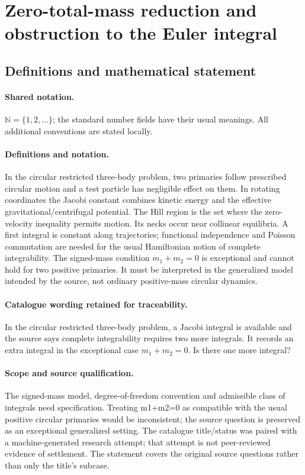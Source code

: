 \documentclass[11pt]{article}
\begin{document}
\section{Zero-total-mass reduction and obstruction to the Euler integral}\label{statement}

\subsection{Definitions and mathematical statement}

\paragraph{Shared notation.}$\mathbb N=\{1,2,\ldots\}$; the standard number fields have their usual meanings. All additional conventions are stated locally.


\paragraph{Definitions and notation.}In the circular restricted three-body problem, two primaries follow prescribed circular motion and a test particle has negligible effect on them. In rotating coordinates the Jacobi constant combines kinetic energy and the effective gravitational/centrifugal potential. The Hill region is the set where the zero-velocity inequality permits motion. Its necks occur near collinear equilibria. A first integral is constant along trajectories; functional independence and Poisson commutation are needed for the usual Hamiltonian notion of complete integrability. The signed-mass condition $m_1+m_2=0$ is exceptional and cannot hold for two positive primaries. It must be interpreted in the generalized model intended by the source, not ordinary positive-mass circular dynamics.

\paragraph{Catalogue wording retained for traceability.}
In the circular restricted three-body problem, a Jacobi integral is available and the source says complete integrability requires two more integrals. It records an extra integral in the exceptional case $m_1+m_2=0$. Is there one more integral?
\paragraph{Scope and source qualification.}The signed-mass model, degree-of-freedom convention and admissible class of integrals need specification. Treating m1+m2=0 as compatible with the usual positive circular primaries would be inconsistent; the source question is preserved as an exceptional generalized setting. The catalogue title/status was paired with a machine-generated research attempt; that attempt is not peer-reviewed evidence of settlement. The statement covers the original source questions rather than only the title’s subcase.
\end{document}
